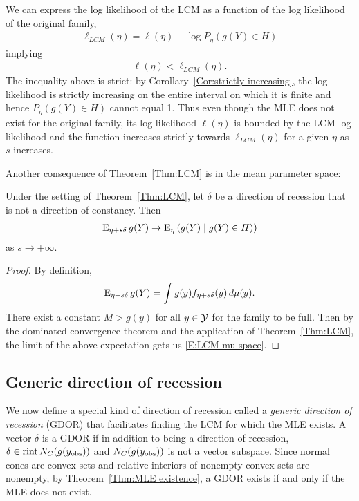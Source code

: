 We can express the log likelihood of the LCM as a function of the 
log likelihood of the original family,
\begin{align} \label{E:LCM ll bound}
 \ell_{LCM}(\eta) = \ell(\eta) - \log P_\eta(g(Y) \in H)
\end{align}
implying
\begin{align*}
	\ell(\eta) < \ell_{LCM}(\eta).	
\end{align*}
The inequality above is strict: by Corollary~\ref{Cor:strictly increasing}, the 
log likelihood is strictly increasing on the entire interval on which it is finite
and hence $P_\eta(g(Y) \in H)$ cannot equal 1.
Thus even though the MLE does not exist for the original family, its log likelihood
$\ell(\eta)$ is bounded by the LCM log likelihood and the function increases strictly
towards $\ell_{LCM}(\eta)$ for a given $\eta$ as $s$ increases.

Another consequence of Theorem~\ref{Thm:LCM} is in the mean parameter space:
\begin{corollary} \label{Cor:LCM mu-space}
Under the setting of Theorem~\ref{Thm:LCM}, let $\delta$ be a direction of 
recession that is not a direction of constancy.  Then
\begin{align} \label{E:LCM mu-space}
	\operatorname{E}_{\eta+ s\delta} g(Y) \to \operatorname{E}_\eta \left ( g(Y) \mid g(Y) \in H ) \right )
\end{align}
as $s \to +\infty$.
\end{corollary}
\begin{proof}
By definition,
\begin{align*}
	\operatorname{E}_{\eta+ s\delta} g(Y) = \int g(y) f_{\eta+ s\delta}(y) \, d\mu(y).
\end{align*}
There exist a constant $M > g(y)$ for all $y \in {\mathcal Y}$ for the family to
be full.  Then
by the dominated convergence theorem and the application of Theorem~\ref{Thm:LCM}, 
the limit of the above expectation gets us \eqref{E:LCM mu-space}.
\end{proof}

\subsection{Generic direction of recession}
We now define a special kind of direction of recession called a 
\emph{generic direction of recession} (GDOR) that facilitates finding the 
LCM for which the MLE exists.
A vector $\delta$ is a GDOR if in addition to being a direction of recession,  
$\delta \in \operatorname{rint} N_C(g(y_{\text{obs}}))$ and $N_C(g(y_{\text{obs}}))$ is not a vector subspace.
Since normal cones are convex sets and relative interiors of nonempty convex sets 
are nonempty, by Theorem~\ref{Thm:MLE existence},
a GDOR exists if and only if the MLE does not exist.

